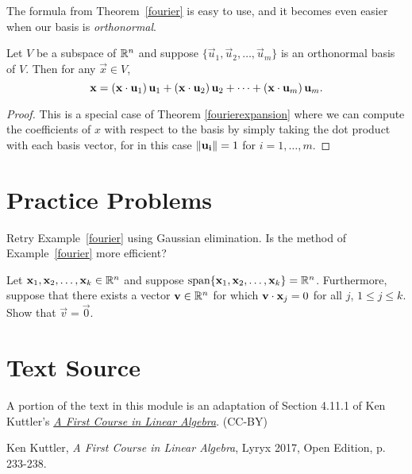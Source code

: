 \documentclass{ximera}
\begin{document}
The formula from Theorem~\ref{fourier} is easy to use, and it becomes even easier when our basis is \emph{orthonormal}.

\begin{corollary}
Let $V$ be a subspace of $\mathbb{R}^n$ and suppose $\{ \vec{u}_1, \vec{u}_2, \ldots, \vec{u}_m \}$
is an orthonormal basis of $V$.
Then for any $\vec{x}\in V$,
\[ \mathbf{x} =
\left(\mathbf{x}\cdot \mathbf{u}_1\right) \mathbf{u}_1 +
\left(\mathbf{x}\cdot \mathbf{u}_2\right) \mathbf{u}_2 +
\cdots +
\left(\mathbf{x}\cdot \mathbf{u}_m\right)  \mathbf{u}_m.
\]
\end{corollary}
\begin{proof}
This is a special case of Theorem \ref{fourierexpansion} where we can compute the coefficients of $x$ with respect to the basis by simply taking the dot product with each basis vector, for in this case $\left\lVert\mathbf{u_i}\right\rVert = 1$ for $i=1,\ldots,m$.
\end{proof}

\section*{Practice Problems}
\begin{problem}\label{prob:rref_way}
Retry Example~\ref{fourier} using Gaussian elimination.  Is the method of Example~\ref{fourier} more efficient?
\end{problem}
\begin{problem}\label{prob:vec_eq_0}
    Let $\mathbf{x}_1, \mathbf{x}_2, \ldots, \mathbf{x}_k\in\mathbb{R}^n$ and
suppose $\mbox{span}\{\mathbf{x}_1, \mathbf{x}_2, \ldots, \mathbf{x}_k\}=\mathbb{R}^n$.
Furthermore, suppose that there exists a vector $\mathbf{v}\in\mathbb{R}^n$ for which $\mathbf{v}\cdot \mathbf{x}_j=0$ for all $j$, $1\leq j\leq k$.
Show that $\vec{v}=\vec{0}$.
\end{problem}
  
\section*{Text Source}
A portion of the text in this module is an adaptation of Section 4.11.1 of Ken Kuttler's \href{https://open.umn.edu/opentextbooks/textbooks/a-first-course-in-linear-algebra-2017}{\it A First Course in Linear Algebra}. (CC-BY)

Ken Kuttler, {\it  A First Course in Linear Algebra}, Lyryx 2017, Open Edition, p. 233-238.  
\end{document}
